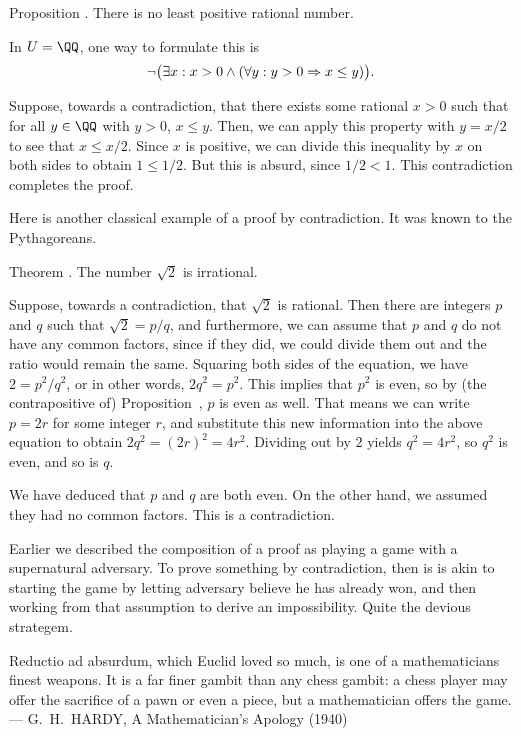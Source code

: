 \proclaim Proposition \advthm. There is no least positive rational number.

\noindent In $U = \QQ$, one way to formulate this is
$$\neg \bigl(\exists x: x > 0 \wedge (\forall y : y > 0 \Rightarrow x \le y)\bigr).$$

\proof Suppose, towards a contradiction, that there exists some rational $x>0$ such that for all $y\in \QQ$
with $y > 0$, $x\le y$. Then, we can apply this property with $y = x/2$ to see that $x \le x/2$.
Since $x$ is positive, we can divide this inequality by $x$ on both sides to obtain $1\le 1/2$. But this
is absurd, since $1/2 < 1$. This contradiction completes the proof.\slug

Here is another classical example of a proof by contradiction. It was known to the Pythagoreans.

\edef\thmsqrttwo{\the\thmcount}
\proclaim Theorem \advthm. The number $\sqrt 2$ is irrational.

\proof Suppose, towards a contradiction, that $\sqrt 2$ is rational. Then there are integers $p$ and $q$
such that $\sqrt 2 = p/q$, and furthermore, we can assume that $p$ and $q$ do not have any common factors,
since if they did, we could divide them out and the ratio would remain the same.
Squaring both sides of the equation, we have $2 = p^2/q^2$, or in other words, $2q^2 = p^2$. This implies
that $p^2$ is even, so by (the contrapositive of) Proposition~{\propsquareoddimpliesodd}, $p$ is even as well.
That means we can write $p=2r$ for some integer $r$, and substitute this new information
into the above equation to obtain $2q^2 = (2r)^2 = 4r^2$. Dividing out by $2$ yields $q^2 = 4r^2$,
so $q^2$ is even, and so is $q$.

We have deduced that $p$ and $q$ are both even. On the other hand, we assumed they had no common factors.
This is a contradiction.\slug

Earlier we described the composition of a proof as playing a game with a supernatural adversary.
To prove something by contradiction, then is is akin to starting the game
by letting adversary believe he has already won,
and then working from that assumption to derive an impossibility. Quite the devious strategem.

\bigskip
\begingroup\obeylines\eightssi
\hfill {\eightss Reductio ad absurdum}, which Euclid loved so much,
\hfill is one of a mathematicians finest weapons.
\hfill It is a far finer gambit than any chess gambit:
\hfill a chess player may offer the sacrifice of a pawn
\hfill or even a piece,
\hfill but a mathematician offers the {\eightss game}.
\eightss
\smallskip
\hfill --- G.~H.~HARDY, {\eightssi A Mathematician's Apology} (1940)
\endgroup%
\bigskip\goodbreak

